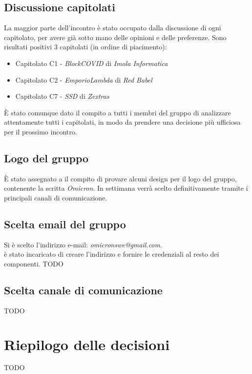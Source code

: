 \documentclass[12pt]{article}
\begin{document}
	\subsection{Discussione capitolati}
	La maggior parte dell'incontro è stato occupato dalla discussione di ogni capitolato, per avere già sotto mano delle opinioni e delle preferenze. Sono risultati positivi 3 capitolati (in ordine di piacimento):
	\begin{itemize}
		\item Capitolato C1 - \textit{BlockCOVID} di \textit{Imola Informatica}
		\item Capitolato C2 - \textit{EmporioLambda} di \textit{Red Babel}
		\item Capitolato C7 - \textit{SSD} di \textit{Zextras}
	\end{itemize}
	È stato comunque dato il compito a tutti i membri del gruppo di analizzare attentamente tutti i capitolati, in modo da prendere una decisione più ufficiosa per il prossimo incontro.
	
	\subsection{Logo del gruppo}
	È stato assegnato a \NM il compito di provare alcuni design per il logo del gruppo, contenente la scritta \textit{Omicron}. In settimana verrà scelto definitivamente tramite i principali canali di comunicazione.
	
	\subsection{Scelta email del gruppo}
	Si è scelto l'indirizzo e-mail: \textit{omicronswe@gmail.com}.\\
	\MDI è stato incaricato di creare l'indirizzo e fornire le credenziali al resto dei componenti. TODO
	
	\subsection{Scelta canale di comunicazione}
	TODO
	
	\section{Riepilogo delle decisioni}
	TODO
\end{document}
